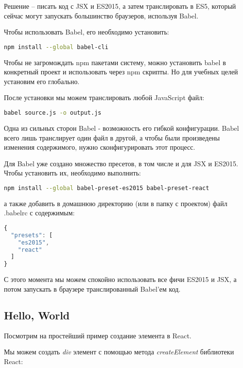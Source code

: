 Решение -- писать код с JSX и ES2015, а затем транслировать в ES5, который сейчас могут запускать большинство браузеров, используя Babel.

Чтобы использовать Babel, его необходимо установить:

\begin{lstlisting}[language=bash]
	npm install --global babel-cli
\end{lstlisting}

Чтобы не загромождать npm пакетами систему, можно установить babel в конкретный проект и использовать через npm скрипты. Но для учебных целей установим его глобально.

После установки мы можем транслировать любой JavaScript файл:

\begin{lstlisting}[language=bash]
	babel source.js -o output.js
\end{lstlisting}

Одна из сильных сторон Babel - возможность его гибкой конфигурации. Babel всего лишь транслирует один файл в другой, а чтобы были произведены изменения содержимого, нужно сконфигурировать этот процесс.

Для Babel уже создано множество пресетов, в том числе и для JSX и ES2015. Чтобы установить их, необходимо выполнить:

\begin{lstlisting}[language=bash]
npm install --global babel-preset-es2015 babel-preset-react	
\end{lstlisting}

а также добавить в домашнюю директорию (или в папку с проектом) файл .babelrc с содержимым:

\begin{lstlisting}[language=JavaScript]
{
  "presets": [
    "es2015",
    "react" 
  ]
}

\end{lstlisting}

С этого момента мы можем спокойно использовать все фичи ES2015 и JSX, а потом запускать в браузере транслированный Babel'ем код.

\subsection{Hello, World}

Посмотрим на простейший пример создание элемента в React. 

Мы можем создать \textit{div} элемент с помощью метода \textit{createElement} библиотеки React:


